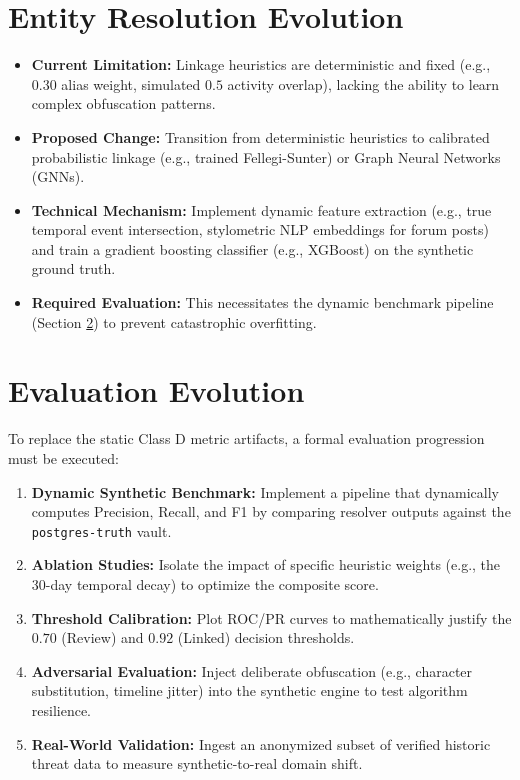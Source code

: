 \section{Entity Resolution Evolution}
\label{sec:fw-er}
\begin{itemize}
    \item \textbf{Current Limitation:} Linkage heuristics are deterministic and fixed (e.g., $0.30$ alias weight, simulated $0.5$ activity overlap), lacking the ability to learn complex obfuscation patterns.
    \item \textbf{Proposed Change:} Transition from deterministic heuristics to calibrated probabilistic linkage (e.g., trained Fellegi-Sunter) or Graph Neural Networks (GNNs).
    \item \textbf{Technical Mechanism:} Implement dynamic feature extraction (e.g., true temporal event intersection, stylometric NLP embeddings for forum posts) and train a gradient boosting classifier (e.g., XGBoost) on the synthetic ground truth.
    \item \textbf{Required Evaluation:} This necessitates the dynamic benchmark pipeline (Section \ref{sec:fw-evaluation}) to prevent catastrophic overfitting.
\end{itemize}

\section{Evaluation Evolution}
\label{sec:fw-evaluation}
To replace the static Class D metric artifacts, a formal evaluation progression must be executed:
\begin{enumerate}
    \item \textbf{Dynamic Synthetic Benchmark:} Implement a pipeline that dynamically computes Precision, Recall, and F1 by comparing resolver outputs against the \texttt{postgres-truth} vault.
    \item \textbf{Ablation Studies:} Isolate the impact of specific heuristic weights (e.g., the 30-day temporal decay) to optimize the composite score.
    \item \textbf{Threshold Calibration:} Plot ROC/PR curves to mathematically justify the $0.70$ (Review) and $0.92$ (Linked) decision thresholds.
    \item \textbf{Adversarial Evaluation:} Inject deliberate obfuscation (e.g., character substitution, timeline jitter) into the synthetic engine to test algorithm resilience.
    \item \textbf{Real-World Validation:} Ingest an anonymized subset of verified historic threat data to measure synthetic-to-real domain shift.
\end{enumerate}

